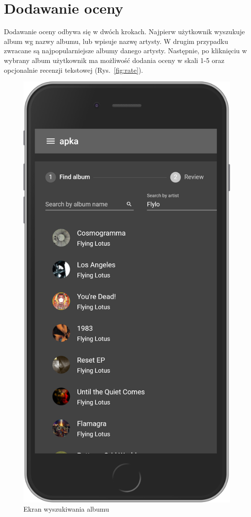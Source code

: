 \section{Dodawanie oceny}
	Dodawanie oceny odbywa się w dwóch krokach.
	Najpierw użytkownik wyszukuje album wg nazwy albumu, lub wpisuje nazwę artysty.
	W drugim przypadku zwracane są najpopularniejsze albumy danego artysty.
	Następnie, po kliknięciu w wybrany album użytkownik ma możliwość dodania oceny w skali 1-5 oraz opcjonalnie recenzji tekstowej (Rys.~\ref{fig:rate}).
	\begin{figure}[H]
		\centering
		\begin{minipage}{.5\textwidth}
			\centering
			\includegraphics[width=0.75\linewidth]{rys07/search.png}
			\caption{Ekran wyszukiwania albumu}

\end{minipage}
\end{figure}
